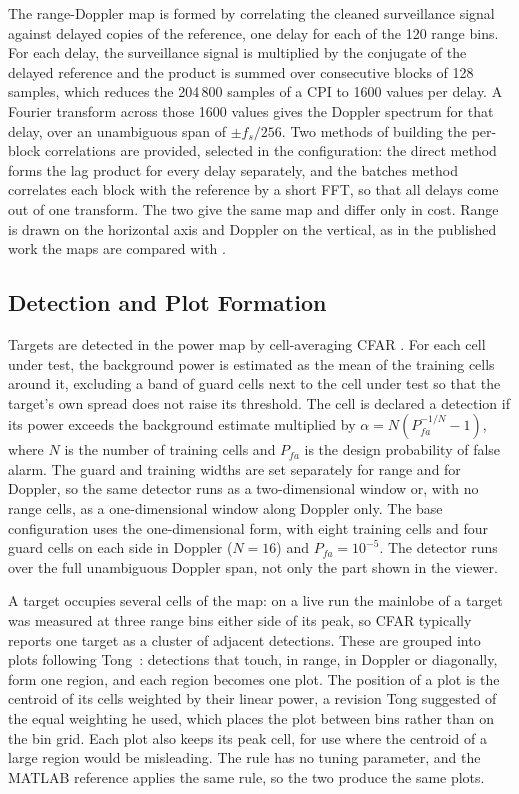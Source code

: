 The range-Doppler map is formed by correlating the cleaned surveillance signal against delayed copies of the reference, one delay for each of the 120 range bins. For each delay, the surveillance signal is multiplied by the conjugate of the delayed reference and the product is summed over consecutive blocks of 128 samples, which reduces the 204\,800 samples of a CPI to 1600 values per delay. A Fourier transform across those 1600 values gives the Doppler spectrum for that delay, over an unambiguous span of $\pm f_s/256$. Two methods of building the per-block correlations are provided, selected in the configuration: the direct method forms the lag product for every delay separately, and the batches method correlates each block with the reference by a short FFT, so that all delays come out of one transform.  The two give the same map and differ only in cost. Range is drawn on the horizontal axis and Doppler on the vertical, as in the published work the maps are compared with \citep{colone2016,schuepbach2020}.

\subsection{Detection and Plot Formation}
\label{subsec:ch3.stages.detection}

Targets are detected in the power map by cell-averaging CFAR \citep{finn1968}. For each cell under test, the background power is estimated as the mean of the training cells around it, excluding a band of guard cells next to the cell under test so that the target's own spread does not raise its threshold. The cell is declared a detection if its power exceeds the background estimate multiplied by $\alpha = N(P_{fa}^{-1/N} - 1)$, where $N$ is the number of training cells and $P_{fa}$ is the design probability of false alarm. The guard and training widths are set separately for range and for Doppler, so the same detector runs as a two-dimensional window or, with no range cells, as a one-dimensional window along Doppler only. The base configuration uses the one-dimensional form, with eight training cells and four guard cells on each side in Doppler ($N = 16$) and $P_{fa} = 10^{-5}$. The detector runs over the full unambiguous Doppler span, not only the part shown in the viewer.

A target occupies several cells of the map: on a live run the mainlobe of a target was measured at three range bins either side of its peak, so CFAR typically reports one target as a cluster of adjacent detections. These are grouped into plots following Tong~\citep{tong2014}: detections that touch, in range, in Doppler or diagonally, form one region, and each region becomes one plot. The position of a plot is the centroid of its cells weighted by their linear power, a revision Tong suggested of the equal weighting he used, which places the plot between bins rather than on the bin grid. Each plot also keeps its peak cell, for use where the centroid of a large region would be misleading. The rule has no tuning parameter, and the MATLAB reference applies the same rule, so the two produce the same plots.


